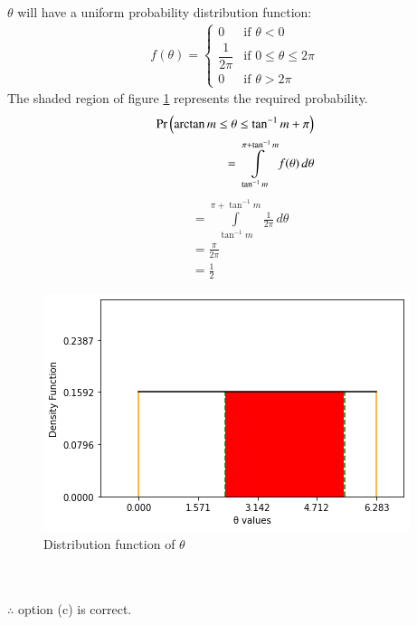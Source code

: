 $\theta$ will have a uniform probability distribution function: 
\begin{align}
    f(\theta)=\nonumber
    \begin{cases}
    0 &\text{if } \theta<0\\
    \dfrac{1}{2\pi} & \text{if } 0\leq\theta\leq2\pi\\
    0 &\text{if } \theta>2\pi
    \end{cases}
\end{align}
The shaded region of figure \ref{ma2001-2.23:fig:my_label} represents the required probability. 
\begin{align}
    \Pr\left(\arctan m\leq\theta\leq\tan^{-1} m +\pi\right)\nonumber\\
    =\displaystyle\int\limits_{\tan^{-1} m}^{\pi + \tan^{-1} m} f(\theta) \,d\theta
\end{align}
\begin{align}
    &=\displaystyle\int\limits_{\tan^{-1} m}^{\pi + \tan^{-1} m} \frac{1}{2\pi} \,d\theta\\
    &=\frac{\pi}{2\pi}\\
    &=\frac{1}{2}
\end{align}
\begin{figure}[h!]
    \centering
    \includegraphics[width=\columnwidth]{solutions/adv/ma/2001/2.23/figures/distribution_2.png}
    \caption{Distribution function of $\theta$}
    \label{ma2001-2.23:fig:my_label}
\end{figure}\\
\\ $\therefore$ option (c) is correct.


